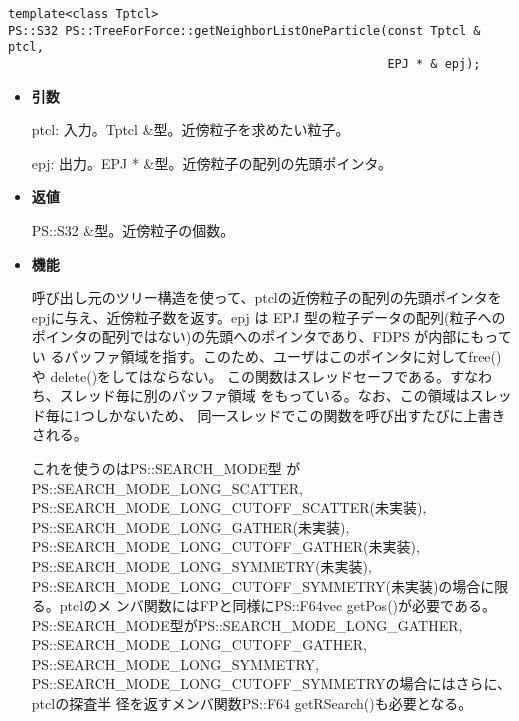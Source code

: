 \label{sec:neighborlist}

\begin{screen}
\begin{verbatim}
template<class Tptcl>
PS::S32 PS::TreeForForce::getNeighborListOneParticle(const Tptcl & ptcl, 
                                                     EPJ * & epj);
\end{verbatim}
\end{screen}

\begin{itemize}

\item {\bf 引数}

ptcl: 入力。Tptcl \&型。近傍粒子を求めたい粒子。

epj: 出力。EPJ * \&型。近傍粒子の配列の先頭ポインタ。

\item {\bf 返値}

PS::S32 \&型。近傍粒子の個数。

\item {\bf 機能}

呼び出し元のツリー構造を使って、ptclの近傍粒子の配列の先頭ポインタを
epjに与え、近傍粒子数を返す。epj は EPJ 型の粒子データの配列(粒子への
ポインタの配列ではない)の先頭へのポインタであり、FDPS が内部にもってい
るバッファ領域を指す。このため、ユーザはこのポインタに対してfree()や
delete()をしてはならない。
この関数はスレッドセーフである。すなわち、スレッド毎に別のバッファ領域
をもっている。なお、この領域はスレッド毎に1つしかないため、
同一スレッドでこの関数を呼び出すたびに上書きされる。


これを使うのはPS::SEARCH\_MODE型
がPS::SEARCH\_MODE\_LONG\_SCATTER,
PS::SEARCH\_MODE\_LONG\_CUTOFF\_SCATTER(未実装), \\
PS::SEARCH\_MODE\_LONG\_GATHER(未実装), \\
PS::SEARCH\_MODE\_LONG\_CUTOFF\_GATHER(未実装), \\
PS::SEARCH\_MODE\_LONG\_SYMMETRY(未実装), \\
PS::SEARCH\_MODE\_LONG\_CUTOFF\_SYMMETRY(未実装)の場合に限る。ptclのメ
ンバ関数にはFPと同様にPS::F64vec getPos()が必要である。
PS::SEARCH\_MODE型がPS::SEARCH\_MODE\_LONG\_GATHER,
PS::SEARCH\_MODE\_LONG\_CUTOFF\_GATHER,
PS::SEARCH\_MODE\_LONG\_SYMMETRY, \\
PS::SEARCH\_MODE\_LONG\_CUTOFF\_SYMMETRYの場合にはさらに、ptclの探査半
径を返すメンバ関数PS::F64 getRSearch()も必要となる。

\end{itemize}

